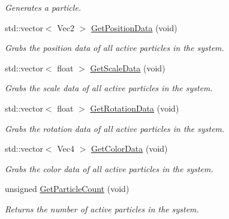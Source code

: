 \begin{DoxyCompactItemize}
\begin{DoxyCompactList}\small\item\em Generates a particle. \end{DoxyCompactList}\item 
std\-::vector$<$ Vec2 $>$ \hyperlink{classDCEngine_1_1Components_1_1SpriteParticleSystem_a5e2b856558ec5e207d4d1f753946f70d}{Get\-Position\-Data} (void)
\begin{DoxyCompactList}\small\item\em Grabs the position data of all active particles in the system. \end{DoxyCompactList}\item 
std\-::vector$<$ float $>$ \hyperlink{classDCEngine_1_1Components_1_1SpriteParticleSystem_a410e6afc89e9bf3de7d132ef6c6d38e4}{Get\-Scale\-Data} (void)
\begin{DoxyCompactList}\small\item\em Grabs the scale data of all active particles in the system. \end{DoxyCompactList}\item 
std\-::vector$<$ float $>$ \hyperlink{classDCEngine_1_1Components_1_1SpriteParticleSystem_abfdd68579627beec5c675a357d2fd730}{Get\-Rotation\-Data} (void)
\begin{DoxyCompactList}\small\item\em Grabs the rotation data of all active particles in the system. \end{DoxyCompactList}\item 
std\-::vector$<$ Vec4 $>$ \hyperlink{classDCEngine_1_1Components_1_1SpriteParticleSystem_ab5722569dddd32cfe43fa413a1bd84ea}{Get\-Color\-Data} (void)
\begin{DoxyCompactList}\small\item\em Grabs the color data of all active particles in the system. \end{DoxyCompactList}\item 
unsigned \hyperlink{classDCEngine_1_1Components_1_1SpriteParticleSystem_a18561a7c7b2c4aadb6718f71ece0206f}{Get\-Particle\-Count} (void)
\begin{DoxyCompactList}\small\item\em Returns the number of active particles in the system. \end{DoxyCompactList}\end{DoxyCompactItemize}
